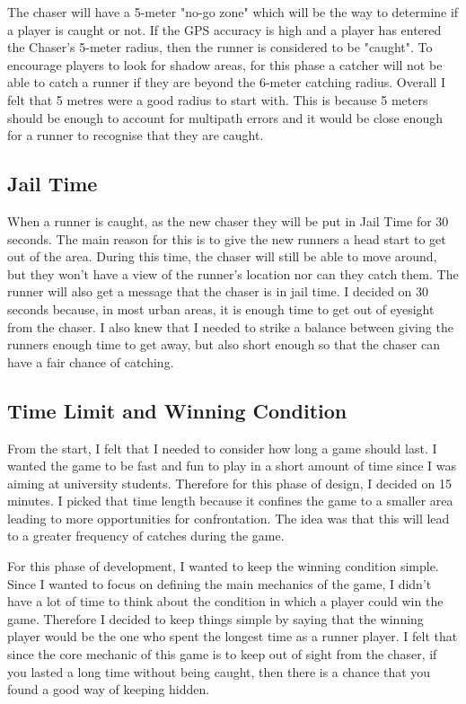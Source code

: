 \documentclass{l4proj}
\begin{document}
The chaser will have a 5-meter "no-go zone" which will be the way to determine if a player is caught or not. If
the GPS accuracy is high and a player has entered the Chaser's 5-meter radius, then the runner is considered to be 
"caught". To encourage players to look for shadow areas, for this phase a catcher will not be able to catch
a runner if they are beyond the 6-meter catching radius. Overall I felt that 5 metres were a good radius to 
start with. This is because 5 meters should be enough to account for multipath errors and it would be close enough
for a runner to recognise that they are caught.

\subsection{Jail Time}
When a runner is caught, as the new chaser they will be put in Jail Time for 30 seconds. The main reason for this is
to give the new runners a head start to get out of the area. During this time, the chaser will still be able to move
around, but they won't have a view of the runner's location nor can they catch them. The runner will also get a message
that the chaser is in jail time. I decided on 30 seconds because, in most urban areas, it is enough time to get out of
eyesight from the chaser. I also knew that I needed to strike a balance between giving the runners enough time to get
away, but also short enough so that the chaser can have a fair chance of catching. 

\subsection{Time Limit and Winning Condition}
From the start, I felt that I needed to consider how long a game should last. I wanted the game to be fast and fun to
play in a short amount of time since I was aiming at university students. Therefore for this phase of design, I decided
on 15 minutes. I picked that time length because it confines the game to a smaller area leading to more opportunities for
confrontation. The idea was that this will lead to a greater frequency of catches during the game.

For this phase of development, I wanted to keep the winning condition simple. Since I wanted to focus on defining the
main mechanics of the game, I didn't have a lot of time to think about the condition in which a player could win the
game. Therefore I decided to keep things simple by saying that the winning player would be the one who spent the longest
time as a runner player. I felt that since the core mechanic of this game is to keep out of sight from the chaser, if you
lasted a long time without being caught, then there is a chance that you found a good way of keeping hidden.
\end{document}
